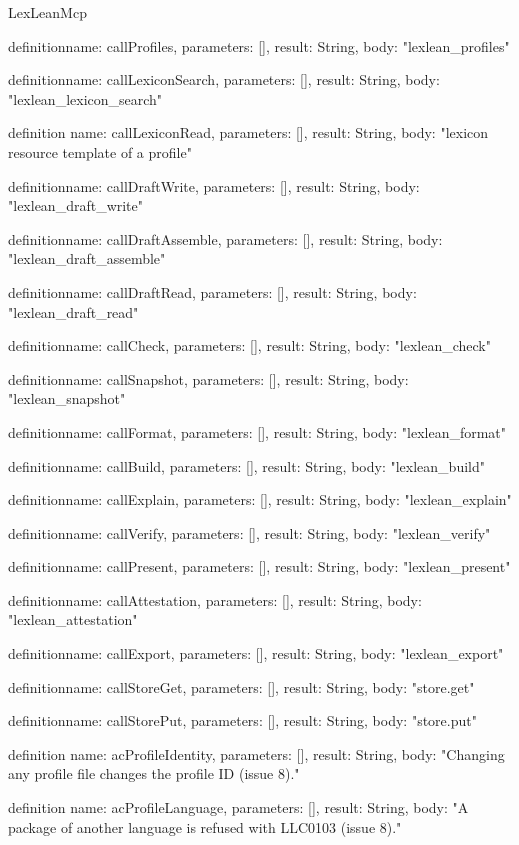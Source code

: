 \begin{lexlean}{LexLeanMcp}
\begin{semanticmodule}
definition{name: callProfiles, parameters: [], result: String, body: "lexlean_profiles"}

definition{name: callLexiconSearch, parameters: [], result: String, body: "lexlean_lexicon_search"}

definition{
  name: callLexiconRead,
  parameters: [],
  result: String,
  body: "lexicon resource template of a profile"
}

definition{name: callDraftWrite, parameters: [], result: String, body: "lexlean_draft_write"}

definition{name: callDraftAssemble, parameters: [], result: String, body: "lexlean_draft_assemble"}

definition{name: callDraftRead, parameters: [], result: String, body: "lexlean_draft_read"}

definition{name: callCheck, parameters: [], result: String, body: "lexlean_check"}

definition{name: callSnapshot, parameters: [], result: String, body: "lexlean_snapshot"}

definition{name: callFormat, parameters: [], result: String, body: "lexlean_format"}

definition{name: callBuild, parameters: [], result: String, body: "lexlean_build"}

definition{name: callExplain, parameters: [], result: String, body: "lexlean_explain"}

definition{name: callVerify, parameters: [], result: String, body: "lexlean_verify"}

definition{name: callPresent, parameters: [], result: String, body: "lexlean_present"}

definition{name: callAttestation, parameters: [], result: String, body: "lexlean_attestation"}

definition{name: callExport, parameters: [], result: String, body: "lexlean_export"}

definition{name: callStoreGet, parameters: [], result: String, body: "store.get"}

definition{name: callStorePut, parameters: [], result: String, body: "store.put"}

definition{
  name: acProfileIdentity,
  parameters: [],
  result: String,
  body: "Changing any profile file changes the profile ID (issue 8)."
}

definition{
  name: acProfileLanguage,
  parameters: [],
  result: String,
  body: "A package of another language is refused with LLC0103 (issue 8)."
}


\end{semanticmodule}
\end{lexlean}
